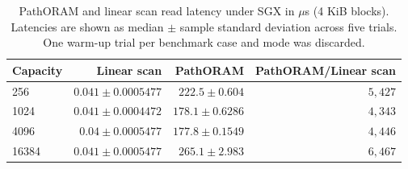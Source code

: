 \begin{table}[H]
\centering
\small
\setlength{\tabcolsep}{4pt}
\begin{tabular}{lrrr}
\toprule
Capacity & Linear scan & PathORAM & PathORAM/Linear scan \\
\midrule
256 & $0.041 \pm 0.0005477$ & $222.5 \pm 0.604$ & $5{,}427$ \\
1024 & $0.041 \pm 0.0004472$ & $178.1 \pm 0.6286$ & $4{,}343$ \\
4096 & $0.04 \pm 0.0005477$ & $177.8 \pm 0.1549$ & $4{,}446$ \\
16384 & $0.041 \pm 0.0005477$ & $265.1 \pm 2.983$ & $6{,}467$ \\
\bottomrule
\end{tabular}
\caption{PathORAM and linear scan read latency under SGX in ${}\mu$s (4 KiB blocks). Latencies are shown as median $\pm$ sample standard deviation across five trials. One warm-up trial per benchmark case and mode was discarded.}
\label{tab:reproduction-table6}
\end{table}
